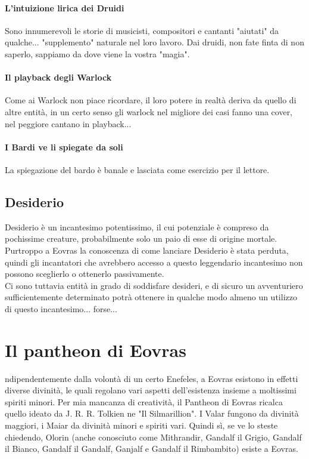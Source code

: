 \paragraph{L'intuizione lirica dei Druidi}Sono innumerevoli le storie di musicisti, compositori e cantanti "aiutati" da qualche... "supplemento" naturale nel loro lavoro. Dai druidi, non fate finta di non saperlo, sappiamo da dove viene la vostra "magia".
\paragraph{Il playback degli Warlock}Come ai Warlock non piace ricordare, il loro potere in realtà deriva da quello di altre entità, in un certo senso gli warlock nel migliore dei casi fanno una cover, nel peggiore cantano in playback...
\paragraph{I Bardi ve li spiegate da soli}La spiegazione del bardo è banale e lasciata come esercizio per il lettore.

\subsection{Desiderio}

Desiderio è un incantesimo potentissimo, il cui potenziale è compreso da pochissime creature, probabilmente solo un paio di esse di origine mortale. \\ Purtroppo a Eovras la conoscenza di come lanciare Desiderio è stata perduta, quindi gli incantatori che avrebbero accesso a questo leggendario incantesimo non possono sceglierlo o ottenerlo passivamente. \\ Ci sono tuttavia entità in grado di soddisfare desideri, e di sicuro un avventuriero sufficientemente determinato potrà ottenere in qualche modo almeno un utilizzo di questo incantesimo... forse...

\section{Il pantheon di Eovras}

ndipendentemente dalla volontà di un certo Enefeles, a Eovras esistono in effetti diverse divinità, le quali regolano vari aspetti dell'esistenza insieme a moltissimi spiriti minori. Per mia mancanza di creatività, il Pantheon di Eovras ricalca quello ideato da J. R. R. Tolkien ne "Il Silmarillion". I Valar fungono da divinità maggiori, i Maiar da divinità minori e spiriti vari. Quindi sì, se ve lo steste chiedendo, Olorin (anche conosciuto come Mithrandir, Gandalf il Grigio, Gandalf il Bianco, Gandalf il Gandalf, Ganjalf e Gandalf il Rimbambito) esiste a Eovras.